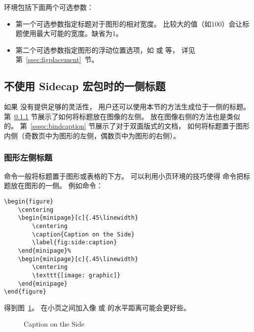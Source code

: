  环境包括下面两个可选参数：
\begin{itemize}
	\item 第一个可选参数指定标题对于图形的相对宽度。
	比较大的值（如100）会让标题使用最大可能的宽度。缺省为1。
	\item 第二个可选参数指定图形的浮动位置选项，如 \opt{[htp]}或 \opt{[!ht]} 等，
	详见第~\ref{ssec:figplacement}~节。
\end{itemize}

\subsection{不使用 Sidecap 宏包时的一侧标题}

如果  没有提供足够的灵活性，
用户还可以使用本节的方法生成位于一侧的标题。
第~\ref{sssec:leftcaption} 节展示了如何将标题放在图像的左侧。
放在图像右侧的方法也是类似的。
第~\ref{sssec:bindcaption} 节展示了对于双面版式的文档，
如何将标题置于图形内侧（奇数页中为图形的左侧，偶数页中为图形的右侧）。

\subsubsection{图形左侧标题}\label{sssec:leftcaption}

  命令一般将标题置于图形或表格的下方。
可以利用小页环境的技巧使得  命令把标题放在图形的一侧。
例如命令：
\begin{lstlisting}
\begin{figure}
	\centering
	\begin{minipage}[c]{.45\linewidth}
		\centering
		\caption{Caption on the Side}
		\label{fig:side:caption}
	\end{minipage}%
	\begin{minipage}[c]{.45\linewidth}
		\centering
		\texttt{[image: graphic]}
	\end{minipage}
\end{figure}
\end{lstlisting}
得到图~\ref{fig:side:caption}。
在小页之间加入像  或  的水平距离可能会更好些。

\begin{figure}
	\centering
	\begin{minipage}[c]{.45\linewidth}
		\centering
		\caption{Caption on the Side}
		\label{fig:side:caption}
	\end{minipage}%
	\begin{minipage}[c]{.45\linewidth}
		\centering
		\resizebox{\linewidth}{!}{\usebox{\boxgraphic}}
	\end{minipage}
\end{figure}

